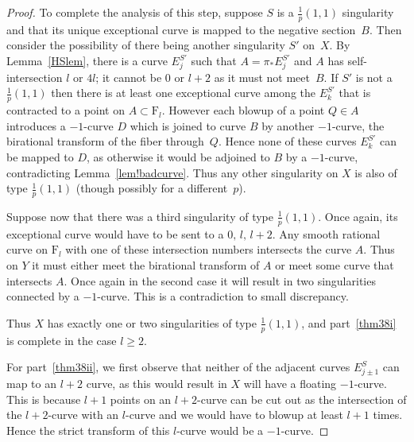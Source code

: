 \documentclass[12pt,a4paper]{book}      %
\theoremstyle{definition}
\newcommand{\ldp}{log del Pezzo}
\newcommand{\mb}[1]{\mathbb{#1}}
\newcommand{\F}{\mathrm{F}}
\begin{document}
\begin{proof}
To complete the analysis of this step, suppose $S$ is a $\frac{1}{p}(1,1)$ singularity and that its unique exceptional curve is mapped to the negative section~$B$. Then consider the possibility of there being another singularity $S'$ on~$X$. By Lemma~\ref{HSlem}, there is a curve $E_j^{S'}$ such that $A=\pi_* E_j^{S'}$ and $A$ has self-intersection $l$ or $4l$; it cannot be $0$ or $l+2$ as it must not meet~$B$. If $S'$ is not a $\frac{1}{p}(1,1)$ then there is at least one exceptional curve among the $E_k^{S'}$ that is contracted to a point on $A\subset\F_l$. However each blowup of a point $Q\in A$ introduces a $-1$-curve $D$ which is joined to curve $B$ by another $-1$-curve, the birational transform of the fiber through~$Q$. Hence none of these curves $E_k^{S'}$ can be mapped to $D$, as otherwise it would be adjoined to $B$ by a $-1$-curve, contradicting Lemma~\ref{lem!badcurve}.
Thus any other singularity on $X$ is also of type $\frac{1}{p}(1,1)$ (though possibly for a different~$p$).

Suppose now that there was a third singularity of type $\frac{1}{p}(1,1)$. Once again, its exceptional curve would have to be sent to a $0, \, l, \, l+2$. Any smooth rational curve on $\F_l$ with one of these intersection numbers intersects the curve $A$. Thus on $Y$ it must either meet the birational transform of $A$ or meet some curve that intersects $A$. Once again in the second case it will result in two singularities connected by a $-1$-curve. This is a contradiction to small discrepancy.

Thus $X$ has exactly one or two singularities of type $\frac{1}p(1,1)$,
and part~\eqref{thm38i} is complete in the case $l\ge2$.






For part~\eqref{thm38ii}, we first observe that neither of the adjacent curves $E_{j\pm1}^S$ can
map to an $l+2$ curve, as this would result in $X$ will have a floating $-1$-curve. This is because $l+1$ points on an $l+2$-curve can be cut out as the intersection of the $l+2$-curve with an $l$-curve and we would have to blowup at least $l+1$ times. Hence the strict transform of this $l$-curve would be a $-1$-curve.


\end{proof}
\end{document}
